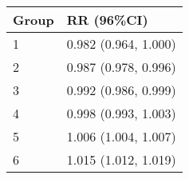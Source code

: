 \begin{tabular}{ll}
  \hline
Group & RR (96\%CI) \\ 
  \hline
   1 & 0.982 (0.964, 1.000) \\ 
     2 & 0.987 (0.978, 0.996) \\ 
     3 & 0.992 (0.986, 0.999) \\ 
     4 & 0.998 (0.993, 1.003) \\ 
     5 & 1.006 (1.004, 1.007) \\ 
     6 & 1.015 (1.012, 1.019) \\ 
   \hline
\end{tabular}

